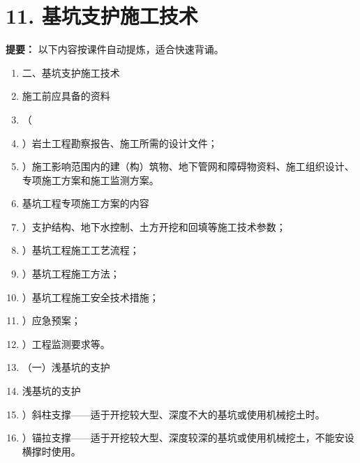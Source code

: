 \documentclass[UTF8,fontset=fandol,11pt]{ctexart}
\begin{document}
\section*{11. 基坑支护施工技术}


\begin{mainbox}

\textbf{提要：} 以下内容按课件自动提炼，适合快速背诵。

\end{mainbox}

\begin{enumerate}[label=\arabic*.]

\item 二、基坑支护施工技术

\item 施工前应具备的资料

\item （

\item ）岩土工程勘察报告、施工所需的设计文件；

\item ）施工影响范围内的建（构）筑物、地下管网和障碍物资料、施工组织设计、专项施工方案和施工监测方案。

\item 基坑工程专项施工方案的内容

\item ）支护结构、地下水控制、土方开挖和回填等施工技术参数；

\item ）基坑工程施工工艺流程；

\item ）基坑工程施工方法；

\item ）基坑工程施工安全技术措施；

\item ）应急预案；

\item ）工程监测要求等。

\item （一）浅基坑的支护

\item 浅基坑的支护

\item ）斜柱支撑——适于开挖较大型、深度不大的基坑或使用机械挖土时。

\item ）锚拉支撑——适于开挖较大型、深度较深的基坑或使用机械挖土，不能安设横撑时使用。


\end{enumerate}
\end{document}
